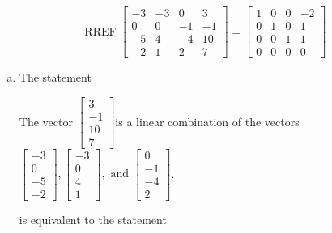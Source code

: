 \begin{exerciseAnswer} 
\[\operatorname{RREF}  \left[\begin{array}{ccc|c}
-3 & -3 & 0 & 3 \\
0 & 0 & -1 & -1 \\
-5 & 4 & -4 & 10 \\
-2 & 1 & 2 & 7
\end{array}\right] = \left[\begin{array}{ccc|c}
1 & 0 & 0 & -2 \\
0 & 1 & 0 & 1 \\
0 & 0 & 1 & 1 \\
0 & 0 & 0 & 0
\end{array}\right] \]
\begin{enumerate}[(a)]
\item  The statement 
\begin{center}\begin{minipage}{0.8\textwidth}
 The vector \( \left[\begin{array}{c}
3 \\
-1 \\
10 \\
7
\end{array}\right] \)is a linear combination of the vectors \( \left[\begin{array}{c}
-3 \\
0 \\
-5 \\
-2
\end{array}\right] , \left[\begin{array}{c}
-3 \\
0 \\
4 \\
1
\end{array}\right] , \text{ and } \left[\begin{array}{c}
0 \\
-1 \\
-4 \\
2
\end{array}\right] \). 
\end{minipage}\end{center}
     is equivalent to the statement 
\begin{center}\begin{minipage}{0.8\textwidth}
 The vector equation \( x_{1} \left[\begin{array}{c}
-3 \\
0 \\
-5 \\
-2

\end{array}
\end{minipage}
\end{center}
\end{enumerate}
\end{exerciseAnswer}

